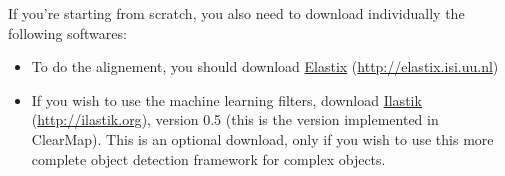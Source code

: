 \documentclass[letterpaper,10pt,english]{sphinxmanual}
\begin{document}
If you’re starting from scratch, you also need to download individually the following softwares:
\begin{itemize}
\item {} 
To do the alignement, you should download \href{http://elastix.isi.uu.nl}{Elastix} (\href{http://elastix.isi.uu.nl}{http://elastix.isi.uu.nl})

\item {} 
If you wish to use the machine learning filters, download \href{http://ilastik.org}{Ilastik} (\href{http://ilastik.org}{http://ilastik.org}), version 0.5 (this is the version implemented in ClearMap). This is an optional download, only if you wish to use this more complete object detection framework for complex objects.

\end{itemize}
\end{document}
